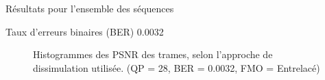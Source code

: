\begin{section}{Résultats pour l'ensemble des séquences}
\begin{subsection}{Taux d'erreurs binaires (BER) 0.0032}
\begin{figure} 
\caption[]{Histogrammes des PSNR des trames, selon l'approche de dissimulation
utilisée. (QP = 28, BER = 0.0032, FMO = Entrelacé)}
\label{fig-HistAllDInterlaced28x32}
\end{figure}
\end{subsection}

\end{section}

